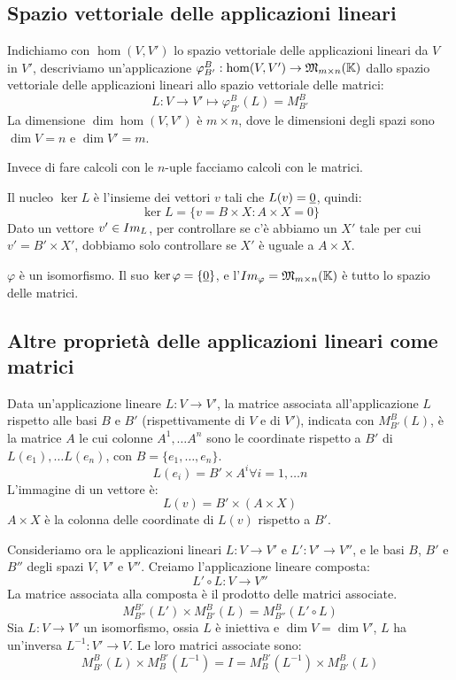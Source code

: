\subsection{Spazio vettoriale delle applicazioni lineari}

Indichiamo con $\hom(V, V')$ lo spazio vettoriale delle applicazioni lineari da $V$ in $V'$, descriviamo un'applicazione $\varphi_{B'}^{B} : \hom(V, V') \to \mathfrak{M}_{m \times n} (\mathbb{K})$ dallo spazio vettoriale delle applicazioni lineari allo spazio vettoriale delle matrici:
\[
{L : V \to V'} \mapsto {\varphi_{B'}^{B} (L) = M_{B'}^{B}}
\]
La dimensione $\dim \hom(V,V')$ \`e $m \times n$, dove le dimensioni degli spazi sono $\dim V = n$ e $\dim V' = m$.

Invece di fare calcoli con le $n$-uple facciamo calcoli con le matrici.

Il nucleo $\ker L$ \`e l'insieme dei vettori $v$ tali che $L(v) = \underline{0}$, quindi:
\[
\ker L = \{ v = B \times X : A \times X = 0\}
\]
Dato un vettore $v' \in Im_{L}$, per controllare se c'\`e abbiamo un $X'$ tale per cui $v' = B' \times X'$, dobbiamo solo controllare se $X'$ \`e uguale a $A \times X$.

$\varphi$ \`e un isomorfismo. Il suo $\ker \varphi = \{ \underline{0} \}$, e l'$Im_{\varphi} = \mathfrak{M}_{m \times n} (\mathbb{K})$ \`e tutto lo spazio delle matrici.

\subsection{Altre propriet\`a delle applicazioni lineari come matrici}

Data un'applicazione lineare $L : V \to V'$, la matrice associata all'applicazione $L$ rispetto alle basi $B$ e $B'$ (rispettivamente di $V$ e di $V'$), indicata con $M_{B'}^{B} (L)$, \`e la matrice $A$ le cui colonne $A^1, \ldots A^n$ sono le coordinate rispetto a $B'$ di $L(e_1), \ldots L(e_n)$, con $B = \{ e_1, \ldots, e_n \}$.
\[
L(e_i) = B' \times A^i \forall i = 1, \ldots n
\]
L'immagine di un vettore \`e:
\[
L(v) = B' \times (A \times X)
\]
$A \times X$ \`e la colonna delle coordinate di $L(v)$ rispetto a $B'$.

Consideriamo ora le applicazioni lineari $L : V \to V'$ e $ L' : V' \to V''$, e le basi $B$, $B'$ e $B''$ degli spazi $V$, $V'$ e $V''$. Creiamo l'applicazione lineare composta:
\[
L' \circ L : V \to V''
\]
La matrice associata alla composta \`e il prodotto delle matrici associate.
\[
M_{B''}^{B'} (L') \times M_{B'}^{B} (L) = M_{B''}^{B} (L' \circ L)
\]
Sia $L : V \to V'$ un isomorfismo, ossia $L$ \`e iniettiva e $\dim V = \dim V'$, $L$ ha un'inversa $L^{-1} : V' \to V$. Le loro matrici associate sono:
\[
M_{B'}^{B} (L) \times M_{B}^{B'} (L^{-1}) = I =
M_{B}^{B'} (L^{-1}) \times M_{B'}^{B} (L)
\]

